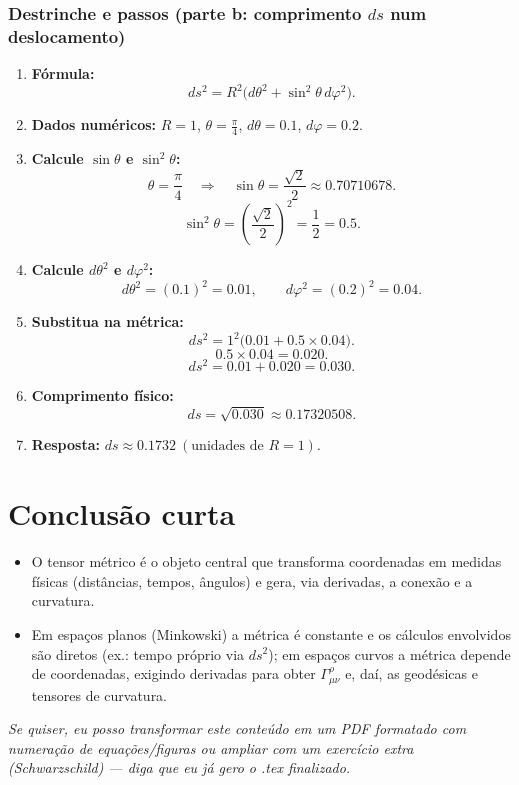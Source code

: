 \documentclass[11pt]{article}
\begin{document}
\subsubsection*{Destrinche e passos (parte b: comprimento \(ds\) num deslocamento)}
\begin{enumerate}
  \item \textbf{Fórmula:}
  \[
    ds^2 = R^2\big(d\theta^2 + \sin^2\theta\,d\varphi^2\big).
  \]
  \item \textbf{Dados numéricos:} \(R=1\), \(\theta=\tfrac{\pi}{4}\), \(d\theta=0.1\), \(d\varphi=0.2\).
  \item \textbf{Calcule \(\sin\theta\) e \(\sin^2\theta\):}
  \[
    \theta=\frac{\pi}{4}\quad\Rightarrow\quad \sin\theta = \frac{\sqrt{2}}{2}\approx 0.70710678.
  \]
  \[
    \sin^2\theta = \left(\frac{\sqrt{2}}{2}\right)^2 = \frac{1}{2} = 0.5.
  \]
  \item \textbf{Calcule \(d\theta^2\) e \(d\varphi^2\):}
  \[
    d\theta^2 = (0.1)^2 = 0.01,\qquad d\varphi^2 = (0.2)^2 = 0.04.
  \]
  \item \textbf{Substitua na métrica:}
  \[
    ds^2 = 1^2\big(0.01 + 0.5\times 0.04\big).
  \]
  \[
    0.5\times 0.04 = 0.020.
  \]
  \[
    ds^2 = 0.01 + 0.020 = 0.030.
  \]
  \item \textbf{Comprimento físico:}
  \[
    ds = \sqrt{0.030} \approx 0.17320508.
  \]
  \item \textbf{Resposta:} \( \boxed{ds \approx 0.1732\ (\text{unidades de }R=1).} \)
\end{enumerate}

\section*{Conclusão curta}
\begin{itemize}
  \item O tensor métrico é o objeto central que transforma coordenadas em medidas físicas (distâncias, tempos, ângulos) e gera, via derivadas, a conexão e a curvatura.
  \item Em espaços planos (Minkowski) a métrica é constante e os cálculos envolvidos são diretos (ex.: tempo próprio via \(ds^2\)); em espaços curvos a métrica depende de coordenadas, exigindo derivadas para obter \(\Gamma^\rho_{\mu\nu}\) e, daí, as geodésicas e tensores de curvatura.
\end{itemize}

\bigskip
\noindent\textit{Se quiser, eu posso transformar este conteúdo em um PDF formatado com numeração de equações/figuras ou ampliar com um exercício extra (Schwarzschild) — diga que eu já gero o .tex finalizado.}
\end{document}
